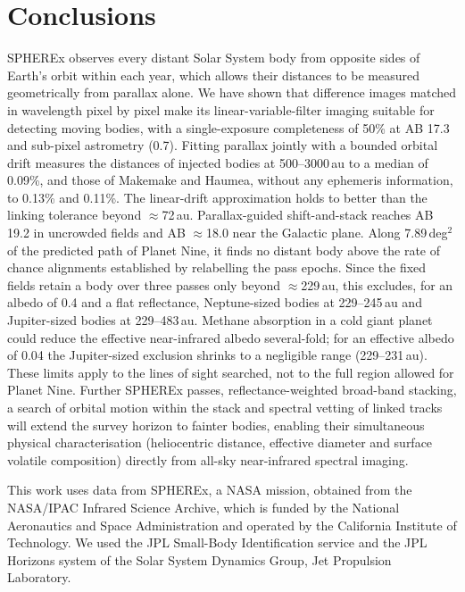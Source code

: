 \documentclass[twocolumn,linenumbers]{aastex702}
\begin{document}
\section{Conclusions}\label{sec:conclusions}
SPHEREx observes every distant Solar System body from opposite sides of Earth's orbit within each year, which allows their distances to be measured geometrically from parallax alone. We have shown that difference images matched in wavelength pixel by pixel make its linear-variable-filter imaging suitable for detecting moving bodies, with a single-exposure completeness of 50\% at AB 17.3 and sub-pixel astrometry (0.7\arcsec). Fitting parallax jointly with a bounded orbital drift measures the distances of injected bodies at 500--3000\,au to a median of 0.09\%, and those of Makemake and Haumea, without any ephemeris information, to 0.13\% and 0.11\%. The linear-drift approximation holds to better than the linking tolerance beyond $\approx$72\,au. Parallax-guided shift-and-stack reaches AB 19.2 in uncrowded fields and AB $\approx$18.0 near the Galactic plane. Along 7.89\,deg$^2$ of the predicted path of Planet Nine, it finds no distant body above the rate of chance alignments established by relabelling the pass epochs. Since the fixed fields retain a body over three passes only beyond $\approx$229\,au, this excludes, for an albedo of 0.4 and a flat reflectance, Neptune-sized bodies at 229--245\,au and Jupiter-sized bodies at 229--483\,au. Methane absorption in a cold giant planet could reduce the effective near-infrared albedo several-fold; for an effective albedo of 0.04 the Jupiter-sized exclusion shrinks to a negligible range (229--231\,au). These limits apply to the lines of sight searched, not to the full region allowed for Planet Nine. Further SPHEREx passes, reflectance-weighted broad-band stacking, a search of orbital motion within the stack and spectral vetting of linked tracks will extend the survey horizon to fainter bodies, enabling their simultaneous physical characterisation (heliocentric distance, effective diameter and surface volatile composition) directly from all-sky near-infrared spectral imaging.

\begin{acknowledgments}
This work uses data from SPHEREx, a NASA mission, obtained from the NASA/IPAC Infrared Science Archive, which is funded by the National Aeronautics and Space Administration and operated by the California Institute of Technology. We used the JPL Small-Body Identification service and the JPL Horizons system of the Solar System Dynamics Group, Jet Propulsion Laboratory.
\end{acknowledgments}
\end{document}

